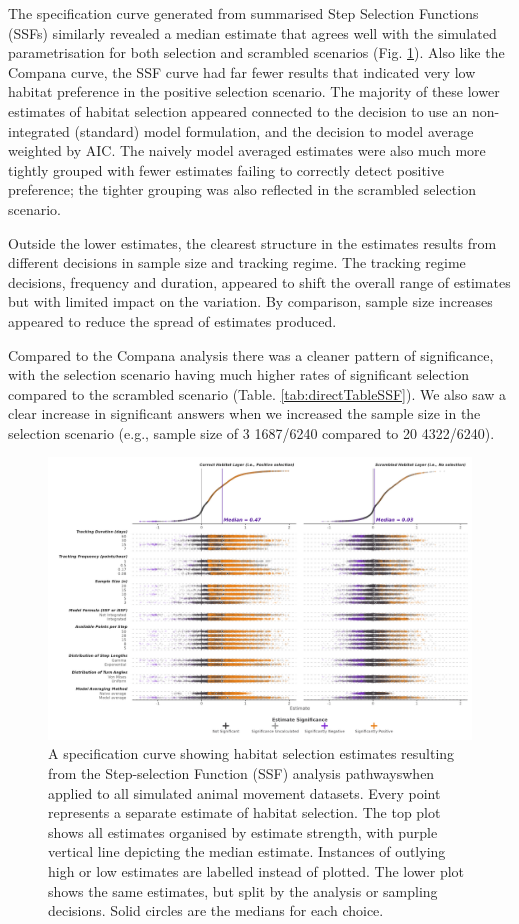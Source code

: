 \documentclass[10pt,a4paper]{article}
\begin{document}
The specification curve generated from summarised Step Selection Functions (SSFs) similarly revealed a median estimate that agrees well with the simulated parametrisation for both selection and scrambled scenarios (Fig. \ref{fig:specCurveSSF}).
Also like the Compana curve, the SSF curve had far fewer results that indicated very low habitat preference in the positive selection scenario.
The majority of these lower estimates of habitat selection appeared connected to the decision to use an non-integrated (standard) model formulation, and the decision to model average weighted by AIC.
The naively model averaged estimates were also much more tightly grouped with fewer estimates failing to correctly detect positive preference; the tighter grouping was also reflected in the scrambled selection scenario.

Outside the lower estimates, the clearest structure in the estimates results from different decisions in sample size and tracking regime.
The tracking regime decisions, frequency and duration, appeared to shift the overall range of estimates but with limited impact on the variation.
By comparison, sample size increases appeared to reduce the spread of estimates produced.

Compared to the Compana analysis there was a cleaner pattern of significance, with the selection scenario having much higher rates of significant selection compared to the scrambled scenario (Table. \ref{tab:directTableSSF}).
We also saw a clear increase in significant answers when we increased the sample size in the selection scenario (e.g., sample size of 3 1687/6240 compared to 20 4322/6240).

\begin{figure}
\includegraphics[width=1\linewidth]{../figures/ssf_specCurve} \caption{A specification curve showing habitat selection estimates resulting from the Step-selection Function (SSF) analysis pathwayswhen applied to all simulated animal movement datasets. Every point represents a separate estimate of habitat selection. The top plot shows all estimates organised by estimate strength, with purple vertical line depicting the median estimate. Instances of outlying high or low estimates are labelled instead of plotted. The lower plot shows the same estimates, but split by the analysis or sampling decisions. Solid circles are the medians for each choice.}\label{fig:specCurveSSF}
\end{figure}
\end{document}
